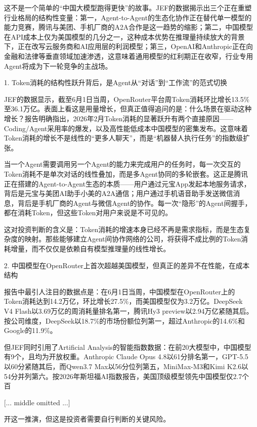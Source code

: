 \documentclass[11pt]{ctexart}
\begin{document}
这不是一个简单的“中国大模型跑得更快”的故事。JEF的数据揭示出三个正在重塑行业格局的结构性变量：第一，Agent-to-Agent的生态化协作正在替代单一模型的能力竞赛，腾讯与美团、手机厂商的A2A合作是这一趋势的缩影；第二，中国模型在API成本上仅为美国模型的几分之一，这种成本优势在推理量持续放大的背景下，正在改写云服务商和AI应用层的利润模型；第三，OpenAI和Anthropic正在向金融和法律等垂直领域加速渗透，这意味着通用模型的红利期正在收窄，行业专用Agent将成为下一轮竞争的主战场。

1. Token消耗的结构性跃升背后，是Agent从“对话”到“工作流”的范式切换

JEF的数据显示，截至6月1日当周，OpenRouter平台周Token消耗环比增长13.5\%至36.1万亿。表面上看这是用量增长，但真正值得追问的是：什么场景在驱动这种增长？报告明确指出，2026年2月Token消耗的显著跃升有两个直接原因——Coding/Agent采用率的爆发，以及高性能低成本中国模型的密集发布。这意味着Token消耗的增长不是线性的“更多人聊天”，而是“机器替人执行任务”的指数级扩张。

当一个Agent需要调用另一个Agent的能力来完成用户的任务时，每一次交互的Token消耗不是单次对话的线性叠加，而是多Agent协同的多轮嵌套。这正是腾讯正在搭建的Agent-to-Agent生态的本质——用户通过元宝App发起本地服务请求，背后是元宝与美团AI助手小美的A2A通信；用户通过手机语音助手发送微信消息，背后是手机厂商的Agent与微信Agent的协作。每一次“隐形”的Agent间握手，都在消耗Token，但这些Token对用户来说是不可见的。

这对投资判断的含义是：Token消耗的增速本身已经不再是需求指标，而是生态复杂度的映射。那些能够建立Agent间协作网络的公司，将获得不成比例的Token消耗增量，而不仅仅是依赖自有模型推理量的线性增长。

2. 中国模型在OpenRouter上首次超越美国模型，但真正的差异不在性能，在成本结构

报告中最引人注目的数据点是：在6月1日当周，中国模型在OpenRouter上的Token消耗达到14.2万亿，环比增长27.5\%，而美国模型仅为3.2万亿。DeepSeek V4 Flash以3.69万亿的周消耗量排名第一，腾讯Hy3 preview以2.94万亿紧随其后。按公司维度，DeepSeek以18.7\%的市场份额位列第一，超过Anthropic的14.6\%和Google的11.9\%。

但JEF同时引用了Artificial Analysis的智能指数数据：在前20大模型中，中国模型有9个，且均为开放权重。Anthropic Claude Opus 4.8以61分排名第一，GPT-5.5以60分紧随其后，而Qwen3.7 Max以56分位列第五，MiniMax-M3和Kimi K2.6以54分并列第六。按2026年斯坦福AI指数报告，美国顶级模型领先中国模型仅2.7个百

[... middle omitted ...]

开这一推演，但这是投资者需要自行判断的关键风险。
\end{document}
